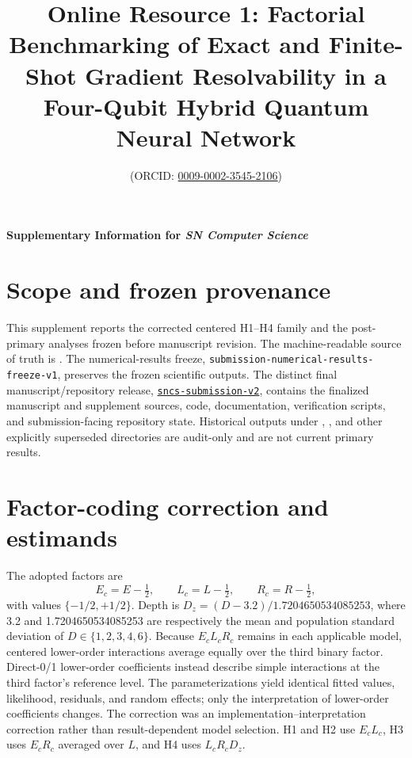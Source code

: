 \documentclass[pdflatex,sn-basic,Numbered]{sn-jnl}
\begin{document}
\title{Online Resource 1: Factorial Benchmarking of Exact and Finite-Shot Gradient Resolvability in a Four-Qubit Hybrid Quantum Neural Network}
\author*[1]{  (ORCID: \href{https://orcid.org/0009-0002-3545-2106}{0009-0002-3545-2106})}
\maketitle

\begin{center}
\textbf{Supplementary Information for \textit{SN Computer Science}}
\end{center}

\section{Scope and frozen provenance}

This supplement reports the corrected centered H1--H4 family and the post-primary analyses frozen before manuscript revision. The machine-readable source of truth is . The numerical-results freeze, \nolinkurl{submission-numerical-results-freeze-v1}, preserves the frozen scientific outputs. The distinct final manuscript/repository release, \href{https://github.com/Brandon-Shen/few-qubit-qnn-snr/tree/sncs-submission-v2}{\texttt{sncs-submission-v2}}, contains the finalized manuscript and supplement sources, code, documentation, verification scripts, and submission-facing repository state. Historical outputs under , , and other explicitly superseded directories are audit-only and are not current primary results.

\section{Factor-coding correction and estimands}

The adopted factors are
\[
E_c=E-\tfrac12,\qquad L_c=L-\tfrac12,\qquad R_c=R-\tfrac12,
\]
with values $\{-1/2,+1/2\}$. Depth is $D_z=(D-3.2)/1.7204650534085253$, where 3.2 and 1.7204650534085253 are respectively the mean and population standard deviation of $D\in\{1,2,3,4,6\}$. Because $E_cL_cR_c$ remains in each applicable model, centered lower-order interactions average equally over the third binary factor. Direct-0/1 lower-order coefficients instead describe simple interactions at the third factor's reference level. The parameterizations yield identical fitted values, likelihood, residuals, and random effects; only the interpretation of lower-order coefficients changes. The correction was an implementation--interpretation correction rather than result-dependent model selection. H1 and H2 use $E_cL_c$, H3 uses $E_cR_c$ averaged over $L$, and H4 uses $L_cR_cD_z$.
\end{document}
